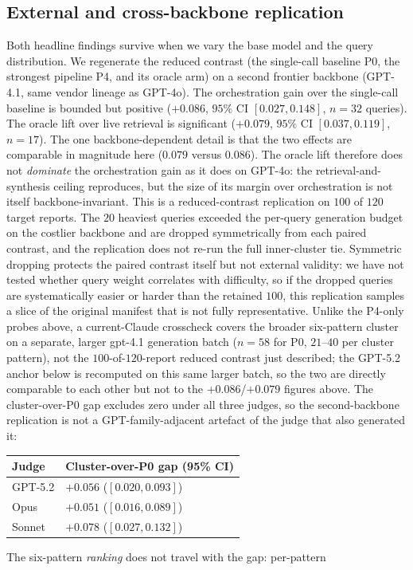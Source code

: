 \documentclass[11pt]{article}
\begin{document}
\subsection{External and cross-backbone replication}\label{sec:extval_backbone}
Both headline findings survive when we vary the base model and the query distribution.
We regenerate the reduced contrast (the single-call baseline P0, the strongest pipeline
P4, and its oracle arm) on a second frontier backbone (GPT-4.1, same vendor lineage as
GPT-4o). The orchestration gain over the single-call baseline
is bounded but positive ($+0.086$, $95\%$ CI $[0.027,0.148]$, $n{=}32$ queries). The
oracle lift over live retrieval is significant ($+0.079$, $95\%$ CI $[0.037,0.119]$,
$n{=}17$). The one backbone-dependent detail is that the two effects are comparable in
magnitude here ($0.079$ versus $0.086$). The oracle lift therefore does not
\emph{dominate} the orchestration gain as it does on GPT-4o: the retrieval-and-synthesis
ceiling reproduces, but the size of its margin over orchestration is not itself
backbone-invariant. This is a reduced-contrast replication on $100$ of $120$ target
reports. The $20$ heaviest queries exceeded the per-query generation budget on the
costlier backbone and are dropped symmetrically from each paired contrast, and the
replication does not re-run the full inner-cluster tie. Symmetric dropping protects the
paired contrast itself but not external validity: we have not tested whether query
weight correlates with difficulty, so if the dropped queries are systematically easier or
harder than the retained $100$, this replication samples a slice of the original
manifest that is not fully representative. Unlike the P4-only probes
above, a current-Claude crosscheck covers the broader six-pattern cluster on a separate,
larger gpt-4.1 generation batch ($n{=}58$ for P0, $21$--$40$ per cluster pattern), not the
$100$-of-$120$-report reduced contrast just described; the GPT-5.2 anchor below is
recomputed on this same larger batch, so the two are directly comparable to each other but
not to the $+0.086$/$+0.079$ figures above. The cluster-over-P0
gap excludes zero under all three judges, so the
second-backbone replication is not a GPT-family-adjacent artefact of the judge that also
generated it:
\begin{center}
\begin{tabular}{ll}
\toprule
Judge & Cluster-over-P0 gap (95\% CI) \\
\midrule
GPT-5.2 & $+0.056$ ($[0.020, 0.093]$) \\
Opus & $+0.051$ ($[0.016, 0.089]$) \\
Sonnet & $+0.078$ ($[0.027, 0.132]$) \\
\bottomrule
\end{tabular}
\end{center} The six-pattern \emph{ranking} does not travel with the gap: per-pattern
\end{document}
